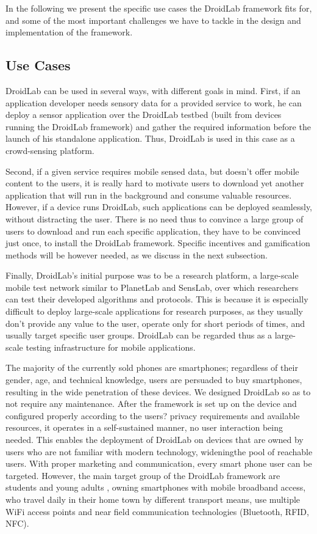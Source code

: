 \documentclass[conference,letterpaper]{IEEEtran}
\begin{document}
In the following we present the specific use cases the DroidLab framework fits for, and some of the most important challenges we have to tackle in the design and implementation of the framework. 

\subsection{Use Cases}

DroidLab can be used in several ways, with different goals in mind. First, if an application developer needs sensory data for a provided service to work, he can deploy a sensor application over the DroidLab testbed (built from devices running the DroidLab framework) and gather the required information before the launch of his standalone application. Thus, DroidLab is used in this case as a crowd-sensing platform.

Second, if a given service requires mobile sensed data, but doesn't offer mobile content to the users, it is really hard to motivate users to download yet another application that will run in the background and consume valuable resources. However, if a device runs DroidLab, such applications can be deployed seamlessly, without distracting the user. There is no need thus to convince a large group of users to download and run each specific application, they have to be convinced just once, to install the DroidLab framework. Specific incentives and gamification methods will be however needed, as we discuss in the next subsection. 

Finally, DroidLab's initial purpose was to be a research platform, a large-scale mobile test network similar to PlanetLab and SensLab, over which researchers can test their developed algorithms and protocols. This is because it is especially difficult to deploy large-scale applications for research purposes, as they usually don't provide any value to the user, operate only for short periods of times, and usually target specific user groups. DroidLab can be regarded thus as a large-scale testing infrastructure for mobile applications. 

The majority of the currently sold phones are smartphones; regardless of their gender, age, and technical knowledge, users are persuaded to buy smartphones, resulting in the wide penetration of these devices. We designed DroidLab so as to not require any maintenance. After the framework is set up on the device and configured properly according to the users? privacy requirements and available resources, it operates in a self-sustained manner, no user interaction being needed. This enables the deployment of DroidLab on devices that are owned by users who are not familiar with modern technology, wideningthe pool of reachable users. With proper marketing and communication, every smart phone user can be targeted. However, the main target group of the DroidLab framework are students and young adults , owning smartphones with mobile broadband access, who travel daily in their home town by different transport means, use multiple WiFi access points and near field communication technologies (Bluetooth, RFID, NFC).
\end{document}
